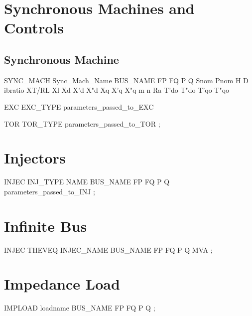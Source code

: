 \section{Synchronous Machines and Controls}


\subsection{Synchronous Machine}

SYNC\_MACH Sync\_Mach\_Name BUS\_NAME FP FQ
P Q Snom Pnom H D ibratio XT/RL Xl Xd X'd X"d Xq X'q
X"q m n Ra T'do T"do T'qo T"qo 

EXC EXC\_TYPE parameters\_passed\_to\_EXC

TOR TOR\_TYPE parameters\_passed\_to\_TOR ; 

\section{Injectors}

INJEC INJ\_TYPE NAME BUS\_NAME FP FQ P Q parameters\_passed\_to\_INJ  ;

\section{Infinite Bus}

 INJEC THEVEQ INJEC\_NAME BUS\_NAME FP FQ P Q MVA ;
 
\section{Impedance Load}

 IMPLOAD loadname BUS\_NAME FP FQ P Q ; 